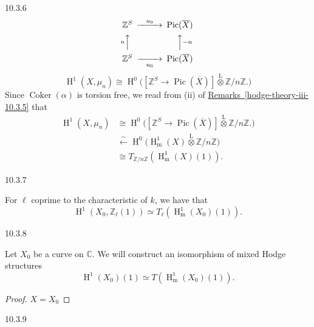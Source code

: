 \begin{construction}{10.3.6}
    \[       \begin {CD}         \mathbb {Z}^S @>{u_0}>> \operatorname {Pic}(\overline {X})       \\@A{n}AA @AA{-n}A       \\\mathbb {Z}^S @>>{u_0}> \operatorname {Pic}(\overline {X})       \end {CD}     \]
    \[       \operatorname {H}^1(X,\mu _n)       \cong  \operatorname {H}^0\big (         [\mathbb {Z}^S\to \operatorname {Pic}(\overline {X})] \overset {\mathrm {L}}{\otimes } \mathbb {Z}{/}n\mathbb {Z}.       \big )     \]
    Since \(\operatorname {Coker}(\alpha )\) is torsion free, we read from (ii) of \hyperref[hodge-theory-iii-10.3.5]{Remarks~\ref*{hodge-theory-iii-10.3.5}} that
    \[       \begin {aligned}         \operatorname {H}^1(X,\mu _n)         &\cong  \operatorname {H}^0\big (           [\mathbb {Z}^S\to \operatorname {Pic}(\overline {X})] \overset {\mathrm {L}}{\otimes } \mathbb {Z}{/}n\mathbb {Z}.         \big )       \\&\xleftarrow {\sim } \operatorname {H}^0\big (           \operatorname {H}_\mathrm {m}^1(X) \overset {\mathrm {L}}{\otimes } \mathbb {Z}{/}n\mathbb {Z}         \big )       \\&\cong  T_{\mathbb {Z}{/}n\mathbb {Z}}(\operatorname {H}_\mathrm {m}^1(X)(1)).       \end {aligned}     \]\end{construction}\begin{variant}{10.3.7}\label{hodge-theory-iii-10.3.7}\skipsinglepar\par{}For \(\ell \) coprime to the characteristic of \(k\), we have that
    \[       \operatorname {H}^1(X_0,\mathbb {Z}_\ell (1))       \simeq  T_\ell (\operatorname {H}_\mathrm {m}^1(X_0)(1)).     \]\end{variant}\begin{construction}{10.3.8}\label{hodge-theory-iii-10.3.8}\skipsinglepar\par{}Let \(X_0\) be a curve on \(\mathbb {C}\).
    We will construct an isomorphism of mixed Hodge structures
    \[       \operatorname {H}^1(X_0)(1)       \simeq  T(\operatorname {H}_\mathrm {m}^1(X_0)(1)).     \]\begin{proof}\(X=X_0\)\end{proof}\end{construction}\begin{construction}{10.3.9}\label{hodge-theory-iii-10.3.9}\skipsinglepar\begin{enumerate}
    

\end{enumerate}
\end{construction}

